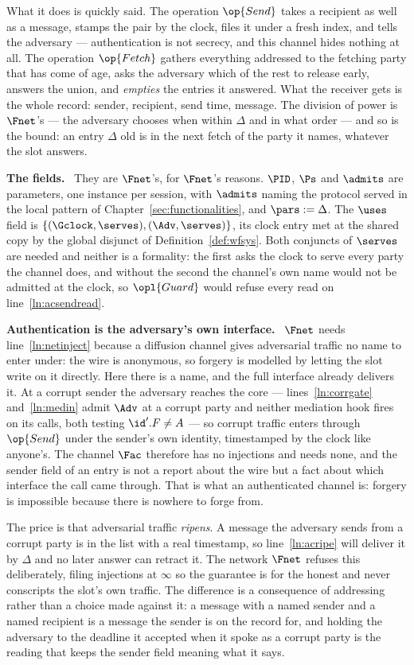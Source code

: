 \documentclass[10pt,oneside,openany]{book}
\newcommand{\heading}[1]{\medskip\par\noindent\textcolor{accent}{\textbf{#1.}}\ }
\theoremstyle{accentdef}
\theoremstyle{accentplain}
\begin{document}
What it does is quickly said. The operation $\op{Send}$ takes a recipient as well as a message, stamps the pair
by the clock, files it under a fresh index, and tells the adversary --- authentication is not
secrecy, and this channel hides nothing at all. The operation $\op{Fetch}$ gathers everything addressed to the
fetching party that has come of age, asks the adversary which of the rest to release early,
answers the union, and \emph{empties} the entries it answered. What the receiver gets is the whole
record: sender, recipient, send time, message. The division of power is $\Fnet$'s --- the
adversary chooses when within $\Delta$ and in what order --- and so is the bound: an entry
$\Delta$ old is in the next fetch of the party it names, whatever the slot answers.

\heading{The fields} They are $\Fnet$'s, for $\Fnet$'s reasons. $\PID$, $\Ps$ and $\admits$ are
parameters, one instance per session, with $\admits$ naming the protocol served in the local
pattern of Chapter~\ref{sec:functionalities}, and $\pars := \Delta$. The $\uses$ field is
$\{(\Gclock,\serves),(\Adv,\serves)\}$, its clock entry met at the shared copy by the global
disjunct of Definition~\ref{def:wfsys}. Both conjuncts of $\serves$ are needed and neither is a
formality: the first asks the clock to serve every party the channel does, and without the second
the channel's own name would not be admitted at the clock, so $\opl{Guard}$ would refuse every
read on line~\ref{ln:acsendread}.

\heading{Authentication is the adversary's own interface} $\Fnet$ needs
line~\ref{ln:netinject} because a diffusion channel gives adversarial traffic no name to enter
under: the wire is anonymous, so forgery is modelled by letting the slot write on it directly.
Here there is a name, and the full interface already delivers it. At a corrupt sender the
adversary reaches the core --- lines~\ref{ln:corrgate} and~\ref{ln:medin} admit $\Adv$ at a
corrupt party and neither mediation hook fires on its calls, both testing $\id'.F \neq A$ --- so
corrupt traffic enters through $\op{Send}$ under the sender's own identity, timestamped by the
clock like anyone's. The channel $\Fac$ therefore has no injections and needs none, and the sender field of an
entry is not a report about the wire but a fact about which interface the call came through. That
is what an authenticated channel is: forgery is impossible because there is nowhere to forge from.

The price is that adversarial traffic \emph{ripens}. A message the adversary sends from a corrupt
party is in the list with a real timestamp, so line~\ref{ln:acripe} will deliver it by $\Delta$
and no later answer can retract it. The network $\Fnet$ refuses this deliberately, filing injections at
$\infty$ so the guarantee is for the honest and never conscripts the slot's own traffic. The
difference is a consequence of addressing rather than a choice made against it: a message with a
named sender and a named recipient is a message the sender is on the record for, and holding the
adversary to the deadline it accepted when it spoke as a corrupt party is the reading that keeps
the sender field meaning what it says.
\end{document}
